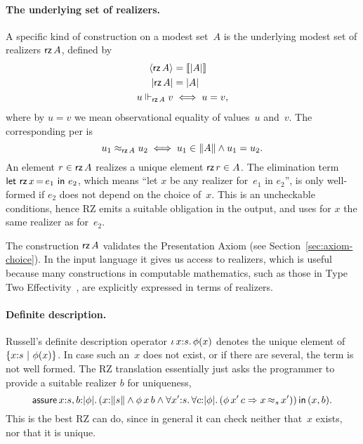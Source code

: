 \paragraph{The underlying set of realizers.}
%
A specific kind of construction on a modest set~$A$ is the underlying
modest set of realizers $\textsf{rz}\,A$, defined by
%
\begin{align*}
  \langle \textsf{rz}\,A \rangle &= [\![|A|]\!] \\
  |\textsf{rz}\,A| &= |A| \\
  u \Vdash_{\textsf{rz}\,A} v &\iff u = v,
\end{align*}
%
where by $u = v$ we mean observational equality of values~$u$ and~$v$.
The corresponding per is
%
\begin{equation*}
  u_1 \approx_{\textsf{rz}\,A} u_2 \iff u_1 \in \|A\| \land u_1 = u_2.
\end{equation*}
%
An element $r \in \textsf{rz}\,A$ realizes a unique element $\textsf{rz}\,r \in A$.
The elimination term $\textsf{let}\ \textsf{rz}\,x\,{=}\,e_1\ \textsf{in}\ e_2$, which means ``let $x$ be
any realizer for~$e_1$ in $e_2$'', is only well-formed if $e_2$ does
not depend on the choice of~$x$. This is an uncheckable conditions,
hence RZ emits a suitable obligation in the output, and uses for $x$
the same realizer as for~$e_2$.

The construction $\textsf{rz}\,A$ validates the Presentation Axiom (see
Section~\ref{sec:axiom-choice}). In the input language it gives us
access to realizers, which is useful because many constructions in
computable mathematics, such as those in Type Two
Effectivity~\cite{Wei00}, are explicitly expressed in terms of
realizers.


\paragraph{Definite description.}
%
Russell's definite description operator $\iota\,x{:}s{.}\, \phi(x)$ denotes
the unique element of $\{x{:}s\ |\ \phi(x)\}$. In case such an~$x$
does not exist, or if there are several, the term is not well formed.
The RZ translation essentially just asks the programmer to provide a
suitable realizer $b$ for uniqueness,
%
\begin{equation*}
  \ooblig{x{:}s,b}{\typeOf{\phi}}{
    (\ototal{x}{s} \land \oapp{\oapp{\phi}{x}}{b} \land
    \oforall{x'}{s}{
      \oforall{c}{\typeOf{\phi}}{
        (\oimply{\oapp{\oapp{\phi}{x'}}{c}}{\oper{s}{x}{x'}})
      }
    })
    }{(x,b)}.
\end{equation*}
%
This is the best RZ can do, since in general it can check neither
that~$x$ exists, nor that it is unique.


